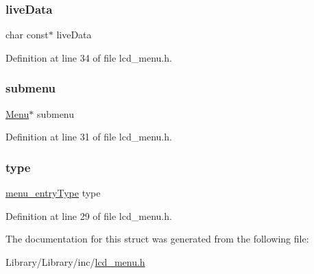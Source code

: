 \subsubsection{\texorpdfstring{live\+Data}{liveData}}
{\footnotesize\ttfamily char const$\ast$ live\+Data}



Definition at line 34 of file lcd\+\_\+menu.\+h.

\mbox{\label{struct_menu_entry___a95d149f99e4a49c9b217e31e0289c696}} 
\subsubsection{\texorpdfstring{submenu}{submenu}}
{\footnotesize\ttfamily \mbox{\hyperlink{lcd__menu_8h_afe0ab1c0311f677767b1588296b0f563}{Menu}}$\ast$ submenu}



Definition at line 31 of file lcd\+\_\+menu.\+h.

\mbox{\label{struct_menu_entry___a9cb8b226841d530cb28f3763c539bf19}} 
\subsubsection{\texorpdfstring{type}{type}}
{\footnotesize\ttfamily \mbox{\hyperlink{lcd__menu_8h_a8803db0b2985fc11bdaaff101b1b999d}{menu\+\_\+entry\+Type}} type}



Definition at line 29 of file lcd\+\_\+menu.\+h.



The documentation for this struct was generated from the following file\+:\begin{DoxyCompactItemize}
\item 
Library/\+Library/inc/\mbox{\hyperlink{lcd__menu_8h}{lcd\+\_\+menu.\+h}}\end{DoxyCompactItemize}
